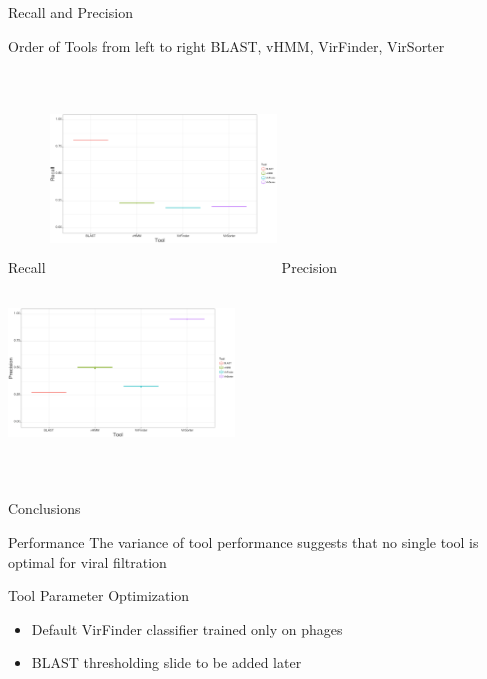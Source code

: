 \documentclass[11pt]{beamer}
\begin{document}
	\begin{frame}{Recall and Precision}
	
	\begin{block}{Order of Tools}
	\tiny{from left to right}
	\center
	\large{BLAST, vHMM, VirFinder, VirSorter}
	\end{block}
	\begin{columns}
	\center
	Recall
	\includegraphics[height=5cm, width=6cm]{Recall.png}
	\center
	Precision
	\includegraphics[height=5cm, width=6cm]{Precision.png}
	\end{columns}
	\end{frame}
	
	\begin{frame}{Conclusions}
	
	\begin{block}{Performance}
	The variance of tool performance suggests that no single tool is optimal for viral filtration
	\end{block}
	
	
	\begin{block}{Tool Parameter Optimization}
	\begin{itemize}
	\item Default VirFinder classifier trained only on phages
	\item BLAST thresholding \alert{slide to be added later}
	\end{itemize}
	\end{block}
	
	
	\end{frame}
	
\end{document}
